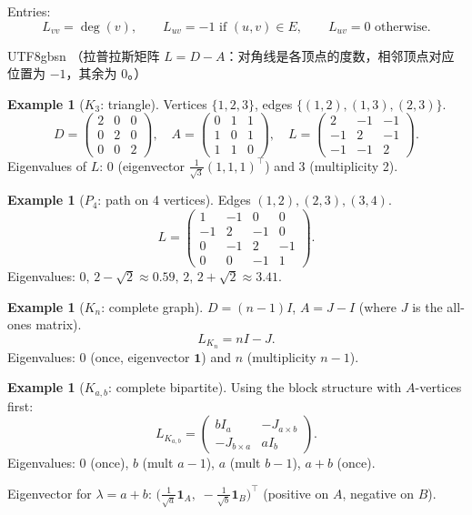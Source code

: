\documentclass[12pt]{article}
\theoremstyle{definition}
\newtheorem{example}[theorem]{Example}
\theoremstyle{remark}
\begin{document}
Entries:
\[
  L_{vv} = \deg(v), \qquad L_{uv} = -1\text{ if }(u,v)\in E, \qquad L_{uv} = 0\text{ otherwise}.
\]

\begin{CJK}{UTF8}{gbsn}
（拉普拉斯矩阵 $L = D - A$：对角线是各顶点的度数，相邻顶点对应位置为 $-1$，其余为 $0$。）
\end{CJK}

\begin{example}[$K_3$: triangle]
Vertices $\{1,2,3\}$, edges $\{(1,2),(1,3),(2,3)\}$.
\[
  D = \begin{pmatrix}2&0&0\\0&2&0\\0&0&2\end{pmatrix},\quad
  A = \begin{pmatrix}0&1&1\\1&0&1\\1&1&0\end{pmatrix},\quad
  L = \begin{pmatrix}2&-1&-1\\-1&2&-1\\-1&-1&2\end{pmatrix}.
\]
Eigenvalues of $L$: $0$ (eigenvector $\frac{1}{\sqrt3}(1,1,1)^\top$) and $3$ (multiplicity 2).
\end{example}

\begin{example}[$P_4$: path on 4 vertices]
Edges $(1,2),(2,3),(3,4)$.
\[
  L = \begin{pmatrix}1&-1&0&0\\-1&2&-1&0\\0&-1&2&-1\\0&0&-1&1\end{pmatrix}.
\]
Eigenvalues: $0,\, 2-\sqrt2 \approx 0.59,\, 2,\, 2+\sqrt2 \approx 3.41$.
\end{example}

\begin{example}[$K_n$: complete graph]
$D = (n-1)I$, $A = J - I$ (where $J$ is the all-ones matrix).
\[
  L_{K_n} = nI - J.
\]
Eigenvalues: $0$ (once, eigenvector $\mathbf{1}$) and $n$ (multiplicity $n-1$).
\end{example}

\begin{example}[$K_{a,b}$: complete bipartite]
Using the block structure with $A$-vertices first:
\[
  L_{K_{a,b}} = \begin{pmatrix}bI_a & -J_{a\times b}\\ -J_{b\times a} & aI_b\end{pmatrix}.
\]
Eigenvalues: $0$ (once), $b$ (mult $a-1$), $a$ (mult $b-1$), $a+b$ (once).

Eigenvector for $\lambda = a+b$: $\big(\frac{1}{\sqrt{a}}\mathbf{1}_A,\; -\frac{1}{\sqrt{b}}\mathbf{1}_B\big)^\top$
(positive on $A$, negative on $B$).
\end{example}
\end{document}
